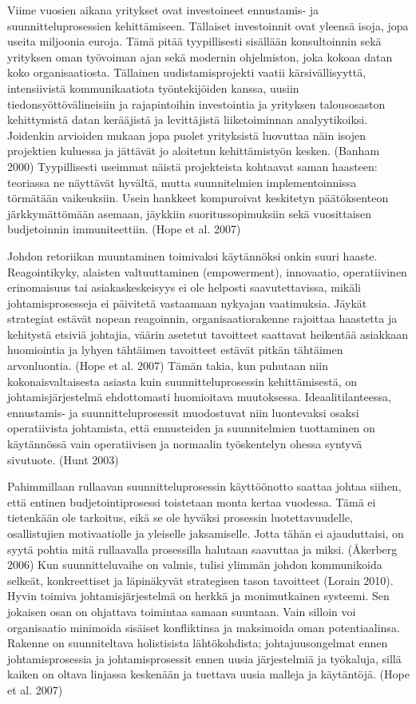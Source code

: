 \documentclass[12pt,a4paper,oneside,pdftex]{report}
\begin{document}
Viime vuosien aikana yritykset ovat investoineet ennustamis- ja suunnitteluprosessien kehittämiseen. Tällaiset investoinnit ovat yleensä isoja, jopa useita miljoonia euroja. Tämä pitää tyypillisesti sisällään konsultoinnin sekä yrityksen oman työvoiman ajan sekä modernin ohjelmiston, joka kokoaa datan koko organisaatiosta. Tällainen uudistamisprojekti vaatii kärsivällisyyttä, intensiivistä kommunikaatiota työntekijöiden kanssa, uusiin tiedonsyöttövälineisiin ja rajapintoihin investointia ja yrityksen talousosaston kehittymistä datan kerääjistä ja levittäjistä liiketoiminnan analyytikoiksi. Joidenkin arvioiden mukaan jopa puolet yrityksistä luovuttaa näin isojen projektien kuluessa ja jättävät jo aloitetun kehittämistyön kesken.  (Banham 2000) Tyypillisesti useimmat näistä projekteista kohtaavat saman haasteen: teoriassa ne näyttävät hyvältä, mutta suunnitelmien implementoinnissa törmätään vaikeuksiin. Usein hankkeet kompuroivat keskitetyn päätöksenteon järkkymättömään asemaan, jäykkiin suoritussopimuksiin sekä vuosittaisen budjetoinnin immuniteettiin. (Hope et al. 2007)

Johdon retoriikan muuntaminen toimivaksi käytännöksi onkin suuri haaste. Reagointikyky, alaisten valtuuttaminen (empowerment), innovaatio, operatiivinen erinomaisuus tai asiakaskeskeisyys ei ole helposti saavutettavissa, mikäli johtamisprosesseja ei päivitetä vastaamaan nykyajan vaatimuksia. Jäykät strategiat estävät nopean reagoinnin, organisaatiorakenne rajoittaa haastetta ja kehitystä etsiviä johtajia, väärin asetetut tavoitteet saattavat heikentää asiakkaan huomiointia ja lyhyen tähtäimen tavoitteet estävät pitkän tähtäimen arvonluontia. (Hope et al. 2007) Tämän takia, kun puhutaan niin kokonaisvaltaisesta asiasta kuin suunnitteluprosessin kehittämisestä, on johtamisjärjestelmä ehdottomasti huomioitava muutoksessa. Ideaalitilanteessa, ennustamis- ja suunnitteluprosessit muodostuvat niin luontevaksi osaksi operatiivista johtamista, että ennusteiden ja suunnitelmien tuottaminen on käytännössä vain operatiivisen ja normaalin työskentelyn ohessa syntyvä sivutuote. (Hunt 2003)

Pahimmillaan rullaavan suunnitteluprosessin käyttöönotto saattaa johtaa siihen, että entinen budjetointiprosessi toistetaan monta kertaa vuodessa. Tämä ei tietenkään ole tarkoitus, eikä se ole hyväksi prosessin luotettavuudelle, osallistujien motivaatiolle ja yleiselle jaksamiselle. Jotta tähän ei ajauduttaisi, on syytä pohtia mitä rullaavalla prosessilla halutaan saavuttaa ja miksi. (Åkerberg 2006) Kun suunnitteluvaihe on valmis, tulisi ylimmän johdon kommunikoida selkeät, konkreettiset ja läpinäkyvät strategisen tason tavoitteet (Lorain 2010). Hyvin toimiva johtamisjärjestelmä on herkkä ja monimutkainen systeemi. Sen jokaisen osan on ohjattava toimintaa samaan suuntaan. Vain silloin voi organisaatio minimoida sisäiset konfliktinsa ja maksimoida oman potentiaalinsa. Rakenne on suunniteltava holistisista lähtökohdista; johtajuusongelmat ennen johtamisprosessia ja johtamisprosessit ennen uusia järjestelmiä ja työkaluja, sillä kaiken on oltava linjassa keskenään ja tuettava uusia malleja ja käytäntöjä. (Hope et al. 2007)
\end{document}
